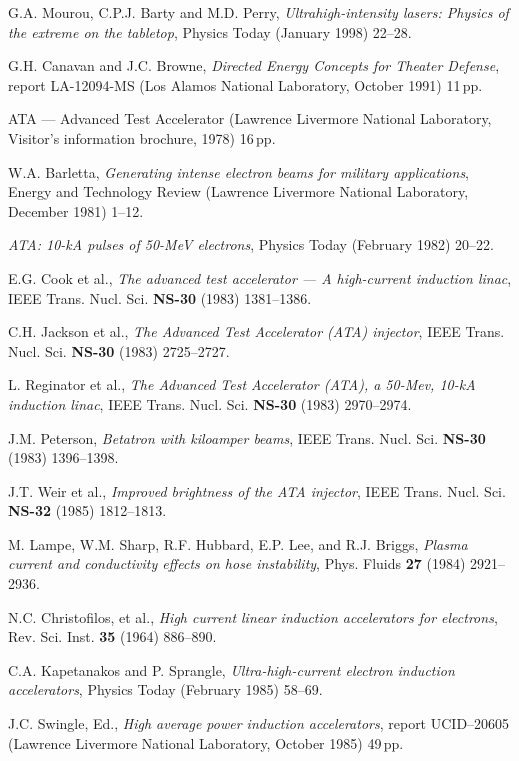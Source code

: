 \documentclass [12pt,a4paper,     ]{report} %
\begin{document}
\begin{enumerate}
 G.A. Mourou, C.P.J. Barty and M.D. Perry, \emph{Ultrahigh-intensity lasers: Physics of the extreme on the tabletop}, Physics Today (January 1998) 22--28.

 G.H. Canavan and J.C. Browne, \emph{Directed Energy Concepts for Theater Defense}, report  LA-12094-MS (Los Alamos National Laboratory, October 1991) 11\,pp.

 ATA --- Advanced Test Accelerator (Lawrence Livermore National Laboratory, Visitor's information brochure, 1978) 16\,pp.

 W.A. Barletta, \emph{Generating intense electron beams for military applications}, Energy and Technology Review (Lawrence Livermore National Laboratory, December 1981) 1--12.

 \emph{ATA: 10-kA pulses of 50-MeV electrons}, Physics Today (February 1982) 20--22.

 E.G. Cook et al., \emph{The advanced test accelerator --- A high-current induction linac}, IEEE Trans. Nucl. Sci. {\bf NS-30} (1983) 1381--1386.

 C.H. Jackson et al., \emph{The Advanced Test Accelerator (ATA) injector}, IEEE Trans. Nucl. Sci. {\bf NS-30} (1983) 2725--2727.

 L. Reginator et al., \emph{The Advanced Test Accelerator (ATA), a 50-Mev, 10-kA induction linac}, IEEE Trans. Nucl. Sci. {\bf NS-30} (1983) 2970--2974.


 J.M. Peterson, \emph{Betatron with kiloamper beams}, IEEE Trans. Nucl. Sci. {\bf NS-30} (1983) 1396--1398.

 J.T. Weir et al., \emph{Improved brightness of the ATA injector}, IEEE Trans. Nucl. Sci. {\bf NS-32} (1985) 1812--1813.

  M. Lampe, W.M. Sharp, R.F. Hubbard, E.P. Lee, and R.J. Briggs, \emph{Plasma current and conductivity effects on hose instability}, Phys. Fluids {\bf 27} (1984) 2921--2936.

 N.C. Christofilos, et al., \emph{High current linear induction accelerators for electrons}, Rev. Sci. Inst. {\bf 35} (1964) 886--890.

 C.A. Kapetanakos and P. Sprangle, \emph{Ultra-high-current electron induction accelerators}, Physics Today (February 1985) 58--69.

 J.C. Swingle, Ed., \emph{High average power induction accelerators}, report UCID--20605 (Lawrence Livermore National Laboratory, October 1985) 49\,pp.


\end{enumerate}
\end{document}
